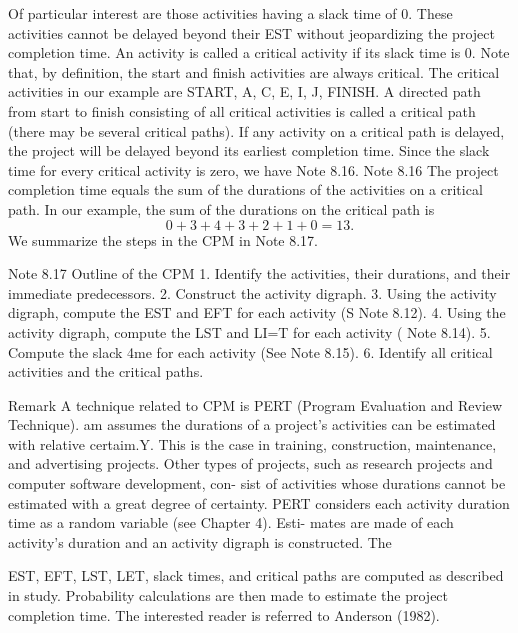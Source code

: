Of particular interest are those activities having a slack time of 0. These activities 
cannot be delayed beyond their EST without jeopardizing the project completion time. 
An activity is called a critical activity if its slack time is 0. Note that, by definition, the 
start and finish activities are always critical. The critical activities in our example are 
START, A, C, E, I, J, FINISH. A directed path from start to finish consisting of all critical 
activities is called a critical path (there may be several critical paths). If any activity on 
a critical path is delayed, the project will be delayed beyond its earliest completion 
time. 
Since the slack time for every critical activity is zero, we have Note 8.16. 
Note 8.16 
The project completion time equals the sum of the durations of the activities 
on a critical path. 
In our example, the sum of the durations on the critical path is 
\[ 0 + 3 + 4 + 3 + 2 + 1 + 0 = 13. \]
We summarize the steps in the CPM in Note 8.17. 
\begin{framed}
Note 8.17 Outline of the CPM 
1. Identify the activities, their durations, and their immediate predecessors. 
2. Construct the activity digraph. 
3. Using the activity digraph, compute the EST and EFT for each activity (S 
Note 8.12). 
4. Using the activity digraph, compute the LST and LI=T for each activity ( 
Note 8.14). 
5. Compute the slack 4me for each activity (See Note 8.15). 
6. Identify all critical activities and the critical paths. 
\end{framed}
Remark A technique related to CPM is PERT (Program Evaluation and Review Technique). am 
assumes the durations of a project's activities can be estimated with relative certaim.Y. 
This is the case in training, construction, maintenance, and advertising projects. Other 
types of projects, such as research projects and computer software development, con-
sist of activities whose durations cannot be estimated with a great degree of certainty. 
PERT considers each activity duration time as a random variable (see Chapter 4). Esti-
mates are made of each activity's duration and an activity digraph is constructed. The 



EST, EFT, LST, LET, slack times, and critical paths are computed as described in study. 
Probability calculations are then made to estimate the project completion time. 
The interested reader is referred to Anderson (1982). 

